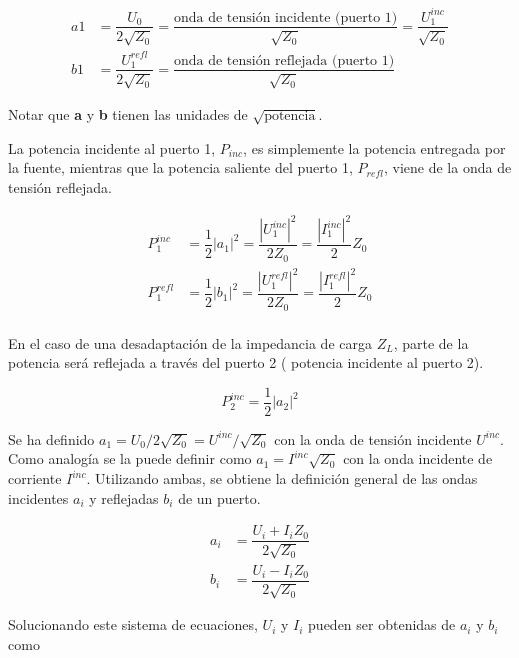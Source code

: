 \begin{equation}
\begin{aligned}
	a1 &= \dfrac{U_0}{2\sqrt{Z_0}}= \dfrac{\textrm{onda de tensión incidente (puerto 1)}}{\sqrt{Z_0}}=\dfrac{U_1^{inc}}{\sqrt{Z_0}} \\
	b1 &= \dfrac{U_1^{refl}}{2\sqrt{Z_0}}= \dfrac{\textrm{onda de tensión reflejada (puerto 1)}}{\sqrt{Z_0}}
\end{aligned}
\end{equation}

Notar que \textbf{a} y \textbf{b} tienen las unidades de $\sqrt{\textrm{potencia}}$.

La potencia incidente al puerto 1, $P_{inc}$, es simplemente la potencia entregada por la fuente, mientras que la potencia saliente 
del puerto 1, $P_{refl}$, viene de la onda de tensión reflejada.

\begin{equation}
\begin{aligned}
	P_1^{inc} &= \dfrac{1}{2}|a_1|^2= \dfrac{|U_1^{inc}|^2}{2Z_0}=\dfrac{|I_1^{inc}|^2}{2}Z_0 \\
	P_1^{refl} &= \dfrac{1}{2}|b_1|^2= \dfrac{|U_1^{refl}|^2}{2Z_0}=\dfrac{|I_1^{refl}|^2}{2}Z_0 \\
\end{aligned}
\end{equation}

En el caso de una desadaptación de la impedancia de carga $Z_L$, parte de la potencia será reflejada a través del puerto 2 (
potencia incidente al puerto 2).

$$
P_2^{inc}=\dfrac{1}{2}|a_2|^2
$$

Se ha definido $a_1 = U_0/2\sqrt{Z_0} = U^{inc}/\sqrt{Z_0}$ con la onda de tensión incidente $U^{inc}$. Como analogía 
se la puede definir como $a_1 = I^{inc}\sqrt{Z_0}$ con la onda incidente de corriente $I^{inc}$. Utilizando ambas, se obtiene la 
definición general de las ondas incidentes $a_i$ y reflejadas $b_i$ de un puerto.

\begin{equation}
\begin{aligned}
	a_i &= \dfrac{U_i + I_iZ_0}{2\sqrt{Z_0}} \\
	b_i &= \dfrac{U_i - I_iZ_0}{2\sqrt{Z_0}}
\end{aligned}
\label{eq:waves}
\end{equation}

Solucionando este sistema de ecuaciones, $U_i$ y $I_i$ pueden ser obtenidas de $a_i$ y $b_i$ como

